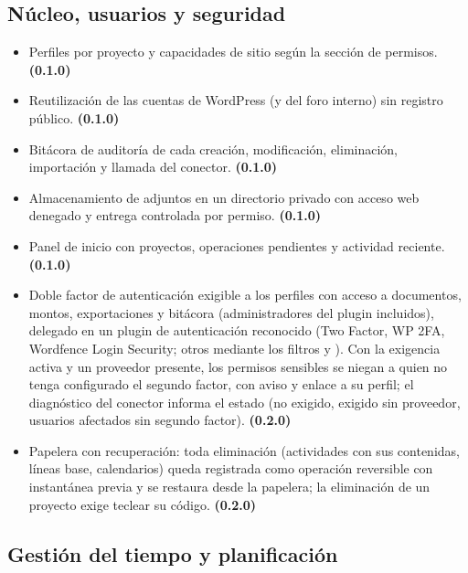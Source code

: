 \documentclass[11pt,a4paper]{article}
\begin{document}
\subsection{Núcleo, usuarios y seguridad}

\begin{itemize}
\item Perfiles por proyecto y capacidades de sitio según la sección de permisos. \textbf{(0.1.0)}
\item Reutilización de las cuentas de WordPress (y del foro interno) sin registro público. \textbf{(0.1.0)}
\item Bitácora de auditoría de cada creación, modificación, eliminación, importación y llamada del conector. \textbf{(0.1.0)}
\item Almacenamiento de adjuntos en un directorio privado con acceso web denegado y entrega controlada por permiso. \textbf{(0.1.0)}
\item Panel de inicio con proyectos, operaciones pendientes y actividad reciente. \textbf{(0.1.0)}
\item Doble factor de autenticación exigible a los perfiles con acceso a documentos, montos, exportaciones y bitácora (administradores del plugin incluidos), delegado en un plugin de autenticación reconocido (Two Factor, WP 2FA, Wordfence Login Security; otros mediante los filtros  y ). Con la exigencia activa y un proveedor presente, los permisos sensibles se niegan a quien no tenga configurado el segundo factor, con aviso y enlace a su perfil; el diagnóstico del conector informa el estado (no exigido, exigido sin proveedor, usuarios afectados sin segundo factor). \textbf{(0.2.0)}
\item Papelera con recuperación: toda eliminación (actividades con sus contenidas, líneas base, calendarios) queda registrada como operación reversible con instantánea previa y se restaura desde la papelera; la eliminación de un proyecto exige teclear su código. \textbf{(0.2.0)}
\end{itemize}

\subsection{Gestión del tiempo y planificación}
\label{sec:tiempo}
\end{document}
